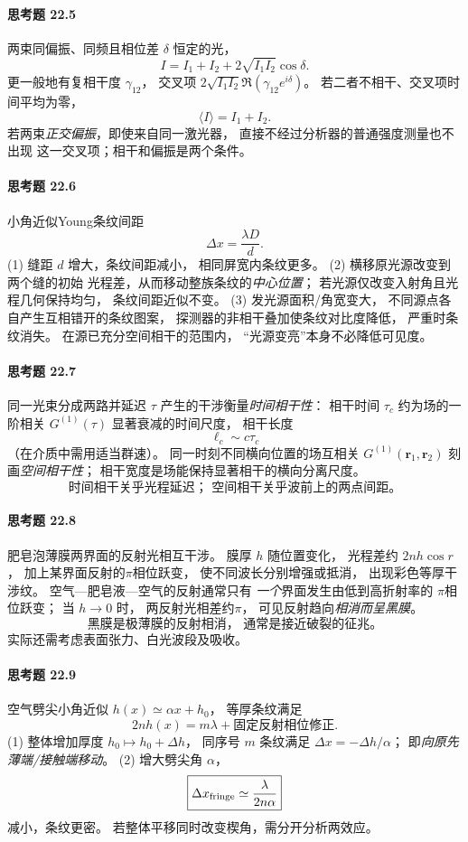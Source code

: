 \paragraph{思考题 22.5}
两束同偏振、同频且相位差 \(\delta\) 恒定的光，
\[
\boxed{I=I_1+I_2+2\sqrt{I_1I_2}\cos\delta}.
\]
更一般地有复相干度 \(\gamma_{12}\)，
交叉项
\(2\sqrt{I_1I_2}\Re(\gamma_{12}e^{i\delta})\)。
若二者不相干、交叉项时间平均为零，
\[
\boxed{\langle I\rangle=I_1+I_2}.
\]
若两束\emph{正交偏振}，即使来自同一激光器，
直接不经过分析器的普通强度测量也不出现
这一交叉项；相干和偏振是两个条件。

\paragraph{思考题 22.6}
小角近似Young条纹间距
\[
\boxed{\Delta x=\frac{\lambda D}{d}}.
\]
(1) 缝距 \(d\) 增大，条纹间距减小，
相同屏宽内条纹更多。
(2) 横移原光源改变到两个缝的初始
光程差，从而移动整族条纹的\emph{中心位置}；
若光源仅改变入射角且光程几何保持均匀，
条纹间距近似不变。
(3) 发光源面积/角宽变大，
不同源点各自产生互相错开的条纹图案，
探测器的非相干叠加使条纹对比度降低，
严重时条纹消失。
在源已充分空间相干的范围内，
“光源变亮”本身不必降低可见度。

\paragraph{思考题 22.7}
同一光束分成两路并延迟 \(\tau\)
产生的干涉衡量\emph{时间相干性}：
相干时间 \(\tau_c\) 约为场的一阶相关
\(G^{(1)}(\tau)\) 显著衰减的时间尺度，
相干长度
\[
\boxed{\ell_c\sim c\tau_c}
\]
（在介质中需用适当群速）。
同一时刻不同横向位置的场互相关
\(G^{(1)}(\boldsymbol r_1,\boldsymbol r_2)\)
刻画\emph{空间相干性}；
相干宽度是场能保持显著相干的横向分离尺度。
\[
\boxed{\text{时间相干关乎光程延迟；
空间相干关乎波前上的两点间距。}}
\]

\paragraph{思考题 22.8}
肥皂泡薄膜两界面的反射光相互干涉。
膜厚 \(h\) 随位置变化，
光程差约 \(2nh\cos r\)，
加上某界面反射的\(\pi\)相位跃变，
使不同波长分别增强或抵消，
出现彩色等厚干涉纹。
空气—肥皂液—空气的反射通常只有
\emph{一个}界面发生由低到高折射率的
\(\pi\)相位跃变；
当 \(h\to0\) 时，
两反射光相差约\(\pi\)，
可见反射趋向\emph{相消而呈黑膜}。
\[
\boxed{\text{黑膜是极薄膜的反射相消，
通常是接近破裂的征兆。}}
\]
实际还需考虑表面张力、白光波段及吸收。

\paragraph{思考题 22.9}
空气劈尖小角近似
\(h(x)\simeq\alpha x+h_0\)，
等厚条纹满足
\[
\boxed{2n h(x)=m\lambda+\text{固定反射相位修正}}.
\]
(1) 整体增加厚度
\(h_0\mapsto h_0+\Delta h\)，
同序号 \(m\) 条纹满足
\(\Delta x=-\Delta h/\alpha\)；
即\emph{向原先薄端/接触端移动}。
(2) 增大劈尖角 \(\alpha\)，
\[
\boxed{\Delta x_{\rm fringe}\simeq
\frac{\lambda}{2n\alpha}}
\]
减小，条纹更密。
若整体平移同时改变楔角，需分开分析两效应。

